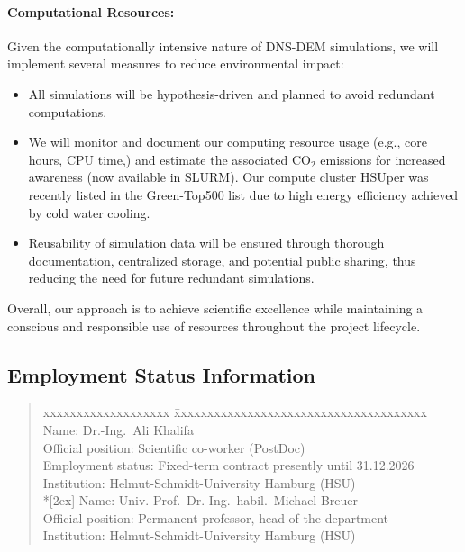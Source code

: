 \documentclass[11pt,a4paper,twoside]{scrartcl}
\begin{document}
\paragraph{Computational Resources:}

Given the computationally intensive nature of DNS-DEM simulations, we
will implement several measures to reduce environmental impact:

  \begin{itemize}
     \item All simulations will be hypothesis-driven and planned to
       avoid redundant computations.

     \item We will monitor and document our computing resource usage
       (e.g., core hours, CPU time,) and estimate the associated
       CO$_2$ emissions for increased awareness (now available in
       SLURM). Our compute cluster HSUper was recently listed in the
       Green-Top500 list due to high energy efficiency achieved by
       cold water cooling.

     \item Reusability of simulation data will be ensured through
       thorough documentation, centralized storage, and potential
       public sharing, thus reducing the need for future redundant
       simulations.
  \end{itemize}

Overall, our approach is to achieve scientific excellence while
maintaining a conscious and responsible use of resources throughout
the project lifecycle.



\subsection{Employment Status Information}

\begin{quote}
	\begin{tabbing}
		xxxxxxxxxxxxxxxxxxx \=
		xxxxxxxxxxxxxxxxxxxxxxxxxxxxxxxxxxxxxx
		\kill
	    Name:                \> Dr.-Ing.\ Ali Khalifa\\
		Official position:   \> Scientific co-worker (PostDoc)\\ 
	    Employment status:   \> Fixed-term contract presently until 
	    31.12.2026 
	    \\
	    							
		Institution:         \> Helmut-Schmidt-University Hamburg (HSU) \\*[2ex]
		Name:                \> Univ.-Prof.\ Dr.-Ing.\ habil.\ Michael Breuer\\
		Official position:   \> Permanent professor, head of the department \\
		Institution:         \> Helmut-Schmidt-University Hamburg (HSU) 
	\end{tabbing}
\end{quote}
\end{document}
